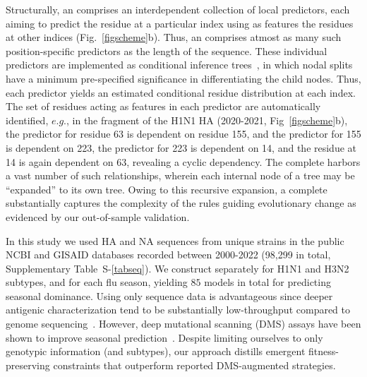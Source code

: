\documentclass[onecolumn, compsoc,10pt]{IEEEtran}
\def\SUPPLEMENTARY{Supplementary\xspace}
\begin{document}
Structurally, an \enet comprises an interdependent collection of  local predictors, each aiming to predict the  residue at a particular index  using as features  the residues   at other  indices  (Fig.~\ref{figscheme}b). Thus,  an \enet comprises atmost as many such  position-specific predictors as the length of the sequence. These individual predictors are implemented as conditional inference trees~\cite{Hothorn06unbiasedrecursive}, in which  nodal splits  have  a minimum pre-specified significance in differentiating the  child nodes. Thus, each predictor yields an estimated conditional residue distribution  at each index. The set of residues acting as features in each predictor are automatically identified, $e.g.$, in the fragment of the  H1N1 HA \enet (2020-2021, Fig~\ref{figscheme}b), the predictor for residue 63 is dependent on   residue  155, and the predictor for  155 is dependent on  223, the predictor for  223 is dependent on  14, and the residue at  14 is again dependent on  63, revealing a cyclic dependency. The complete \enet harbors a vast number of such  relationships, wherein each internal node of a tree may be  ``expanded'' to its own tree. Owing to this recursive expansion,  a complete \enet substantially captures the complexity of the rules guiding evolutionary change as evidenced by our out-of-sample validation.

In this study we used  HA and NA  sequences from   unique \infl strains in the public NCBI and GISAID databases recorded between 2000-2022 (98,299 in total, \SUPPLEMENTARY Table~S-\ref{tabseq}). We  construct  separately for H1N1 and H3N2 subtypes, and for each flu season, yielding $85$ models in total for predicting seasonal dominance. Using only sequence data is advantageous since deeper antigenic characterization  tend to be substantially  low-throughput compared to genome sequencing~\cite{wood2012reproducibility}. However,   deep mutational scanning (DMS) assays  have been shown to improve seasonal prediction~\cite{huddleston2020integrating}. Despite limiting ourselves to only genotypic  information (and subtypes), our approach  distills  emergent  fitness-preserving constraints   that outperform reported DMS-augmented strategies.
\end{document}
